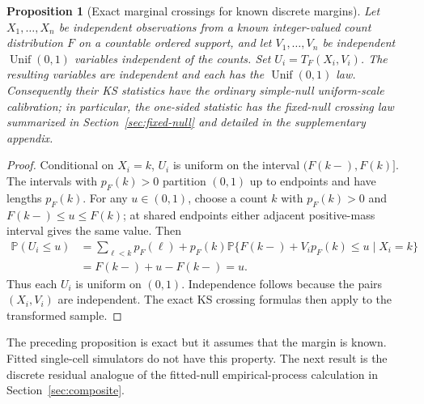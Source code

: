 \documentclass[preprint,12pt]{elsarticle}
\newcommand{\Prob}{\mathbb{P}}
\theoremstyle{plain}
\newtheorem{proposition}[theorem]{Proposition}
\theoremstyle{remark}
\begin{document}
\begin{proposition}[Exact marginal crossings for known discrete margins]
\label{prop:known-discrete-margin}
Let $X_1,\ldots,X_n$ be independent observations from a known integer-valued
count distribution $F$ on a countable ordered support, and let
$V_1,\ldots,V_n$ be independent $\operatorname{Unif}(0,1)$ variables
independent of the counts. Set $U_i=T_F(X_i,V_i)$. The resulting variables are
independent and each has the $\operatorname{Unif}(0,1)$ law. Consequently their
KS statistics have the ordinary simple-null uniform-scale calibration; in
particular, the one-sided statistic has the fixed-null crossing law summarized
in Section~\ref{sec:fixed-null} and detailed in the supplementary appendix.
\end{proposition}

\begin{proof}
Conditional on $X_i=k$, $U_i$ is uniform on the interval
$(F(k-),F(k)]$. The intervals with $p_F(k)>0$ partition $(0,1)$ up to endpoints and
have lengths $p_F(k)$. For any $u\in(0,1)$, choose a count $k$ with
$p_F(k)>0$ and $F(k-)\le u\le F(k)$; at shared endpoints either adjacent
positive-mass interval gives the same value. Then
\[
\begin{aligned}
\Prob(U_i\le u)
&=\sum_{\ell<k}p_F(\ell)+p_F(k)
  \Prob\{F(k-)+V_i p_F(k)\le u\mid X_i=k\}\\
&=F(k-)+u-F(k-)=u.
\end{aligned}
\]
Thus each $U_i$ is uniform on $(0,1)$. Independence follows because the pairs
$(X_i,V_i)$ are independent. The exact KS crossing formulas then apply to the
transformed sample.
\end{proof}

The preceding proposition is exact but it assumes that the margin is known.
Fitted single-cell simulators do not have this property. The next result is the
discrete residual analogue of the fitted-null empirical-process calculation in
Section~\ref{sec:composite}.
\end{document}
